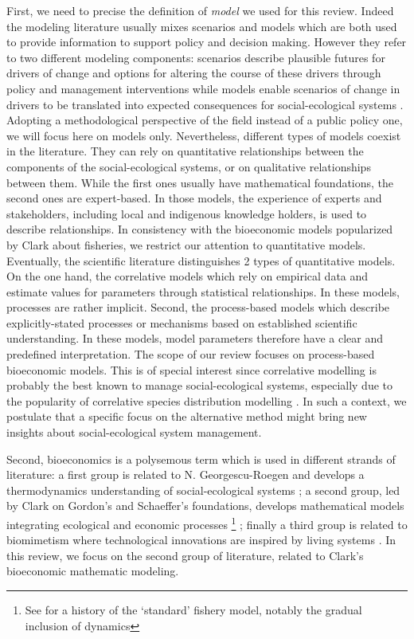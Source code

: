 First, we need to precise the definition of \textit{model} we used for this review. Indeed the modeling literature usually mixes scenarios and models which are  both used to provide information to support policy and decision making. However they refer to two different modeling components:
scenarios describe plausible futures for drivers of change and options for altering the course of these drivers through policy and management interventions while models enable scenarios of change in drivers to be
translated into expected consequences for social-ecological systems \citep{IPBES2016}. Adopting a methodological perspective of the field instead of a public policy one, we will focus here on models only. Nevertheless, different types of models coexist in the literature. They can rely on quantitative relationships between the components of the social-ecological systems, or on qualitative relationships between them. While the first ones usually have mathematical foundations, the second ones are expert-based. In those models, the experience of experts and stakeholders, including local and indigenous knowledge holders, is used to describe relationships. In consistency with the bioeconomic models popularized by Clark about fisheries, we restrict our attention to quantitative models.
Eventually, the scientific literature distinguishes 2 types of quantitative models. On the one hand, the correlative models which rely on empirical data and estimate values for parameters through statistical relationships. In these models, processes are rather implicit. Second, the process-based models which describe explicitly-stated processes or mechanisms based on established scientific understanding. In these models, model parameters therefore have a clear and predefined interpretation. The scope of our review focuses on process-based bioeconomic models. This is of special interest since correlative modelling  is probably the best known to manage social-ecological systems, especially due to the popularity of correlative species distribution modelling \citep{Elith2009}. In such a context, we postulate that a specific focus on the alternative method might bring new insights about social-ecological system management.



Second, bioeconomics is a polysemous term which is used in different strands of literature: a first group is related to  N. Georgescu-Roegen and develops a thermodynamics understanding of social-ecological systems \citep{GeorgescuRoegen}; a second group, led by Clark on Gordon's and Schaeffer's foundations, develops mathematical models integrating ecological and economic processes  \citep{Clark630,Clark73, schaefer_some_1957}\footnote{See \cite{Parent_Mouysset_Missemer_Levrel_2024} for a history of the `standard' fishery model, notably the gradual inclusion of dynamics} ; finally a third group is related to biomimetism where technological innovations are inspired by living systems \citep{VANLANCKER201660}.
In this review, we focus  on the second group of literature, related to Clark's bioeconomic mathematic modeling.

